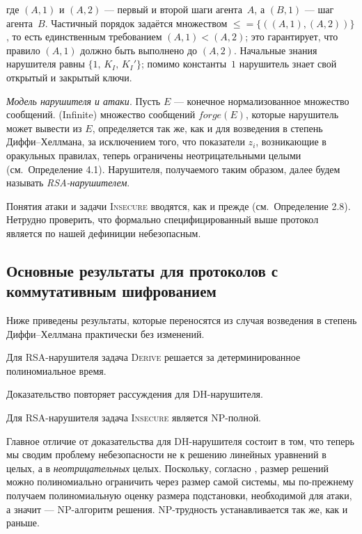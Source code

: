 где \((A,1)\) и \((A,2)\) — первый и второй шаги агента~$A$,
а \((B,1)\) — шаг агента~$B$.
Частичный порядок задаётся множеством 
\(\leqslant=\{((A,1),(A,2))\}\), то есть единственным
требованием \((A,1)<(A,2)\); это гарантирует,
что правило \((A,1)\) должно быть выполнено до \((A,2)\).
Начальные знания нарушителя равны
\(\{1,\,K_{I},\,K_{I}'\}\); помимо константы~$1$
нарушитель знает свой открытый и закрытый ключи.

\textit{Модель нарушителя и атаки}. Пусть $E$ — конечное нормализованное множество сообщений.
(Infinite) множество сообщений \(\mathit{forge}(E)\), которые нарушитель
может вывести из $E$, определяется так же, как и для возведения в степень
Диффи–Хеллмана, за исключением того, что показатели $z_{i}$, возникающие
в оракульных правилах, теперь ограничены неотрицательными целыми
(см.~Определение 4.1).  Нарушителя, получаемого таким образом,
далее будем называть \emph{RSA-нарушителем}.

Понятия атаки и задачи \textsc{Insecure} вводятся, как и прежде
(см.~Определение 2.8).  Нетрудно проверить, что формально
специфицированный выше протокол является по нашей дефиниции
небезопасным.

\subsection{Основные результаты для протоколов
            с коммутативным шифрованием}

Ниже приведены результаты, которые переносятся из случая
возведения в степень Диффи–Хеллмана практически без изменений.

\begin{theorem}[7.1]
Для RSA-нарушителя задача \textsc{Derive} решается
за детерминированное полиномиальное время.
\end{theorem}

\noindent
Доказательство повторяет рассуждения для DH-нарушителя.

\begin{theorem}[7.2]
Для RSA-нарушителя задача \textsc{Insecure} является NP-полной.
\end{theorem}

\noindent
Главное отличие от доказательства для DH-нарушителя состоит в том, что
теперь мы сводим проблему небезопасности не к решению линейных
уравнений в целых, а в \emph{неотрицательных} целых. Поскольку,
согласно \cite{BorshTreybig1976}, размер решений можно
полиномиально ограничить через размер самой системы,
мы по-прежнему получаем полиномиальную оценку размера подстановки,
необходимой для атаки, а значит — NP-алгоритм решения.
NP-трудность устанавливается так же, как и раньше.
